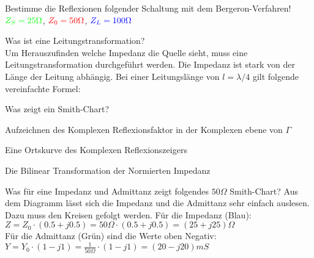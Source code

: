 \begin{karte}{Bestimme die Reflexionen folgender Schaltung mit dem Bergeron-Verfahren!
		\scalebox{.6}{}\\
		 \small $\color{green}Z_S = 25\Omega$, $\color{red}Z_0 = 50\Omega$, $\color{blue}Z_L = 100\Omega$}
	\scalebox{.82}{}
	 
\end{karte}

\begin{karte}{Was ist eine Leitungstransformation?}
	\scalebox{.6}{}\\
	Um Herauszufinden welche Impedanz die Quelle sieht, muss eine Leitungstransformation durchgeführt werden. Die Impedanz ist stark von der Länge der Leitung abhängig.
	Bei einer Leitungslänge von $l=\lambda/4$ gilt folgende vereinfachte Formel:
\end{karte}

\begin{karte}{Was zeigt ein Smith-Chart?}
	\begin{compactitem}
		\item Aufzeichnen des Komplexen Reflexionsfaktor in der Komplexen ebene von $\Gamma$
		\item Eine Ortskurve des Komplexen Reflexionszeigers
		\item Die Bilinear Transformation der Normierten Impedanz
	\end{compactitem}
	\centering
	\scalebox{.4}{}
\end{karte}

\begin{karte}{Was für eine Impedanz und Admittanz zeigt folgendes $50\Omega$ Smith-Chart?
		\scalebox{.4}{}}
	\centering
	\scalebox{.35}{}
	\flushleft \vspace{-12pt}
	Aus dem Diagramm lässt sich die Impedanz und die Admittanz sehr einfach auslesen. Dazu muss den Kreisen gefolgt werden. Für die Impedanz (Blau):\\
	$Z = Z_0 \cdot (0.5 + j0.5) = 50\Omega \cdot (0.5 + j0.5) = (25 + j25)\Omega$\\
	Für die Admittanz (Grün) sind die Werte oben Negativ:\\
	$Y = Y_0 \cdot (1 - j1) = \frac{1}{50\Omega} \cdot (1 - j1) = (20 - j20)mS$
\end{karte}

